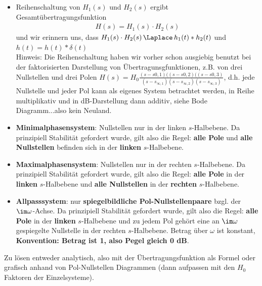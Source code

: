 \begin{Werkzeug}
\begin{itemize}
  \item Reihenschaltung von $H_1(s)$ und $H_2(s)$ ergibt Gesamtübertragungsfunktion
  \begin{align}
    H(s) = H_1(s) \cdot H_2(s)
  \end{align}
  und wir erinnern uns, dass $H_1(s)\cdot H_2(s) \,\Laplace\, h_1(t)\ast h_2(t)$
  und $h(t) = h(t)\ast \delta(t)$\\
  Hinweis: Die Reihenschaltung haben wir vorher schon ausgiebig benutzt bei der faktorisierten
  Darstellung von Übertragunsgfunktionen, z.B. von drei Nullstellen und drei Polen
  $H(s) = H_0 \frac{(s-s{0,1})((s-s{0,2})((s-s{0,3})}{(s-s_{\infty,1})(s-s_{\infty,2})(s-s_{\infty,3})}$,
  d.h. jede Nullstelle und jeder Pol kann als eigenes System betrachtet werden, in Reihe
  multiplikativ und in dB-Darstellung dann additiv, siehe Bode Diagramm...also kein
  Neuland.
  \item \textbf{Minimalphasensystem}: Nullstellen nur in der linken $s$-Halbebene. Da prinzipiell
  Stabilität gefordert wurde, gilt also die Regel: \textbf{alle Pole} und \textbf{alle Nullstellen}
  befinden sich in der \textbf{linken} $s$-Halbebene.
  \item \textbf{Maximalphasensystem}: Nullstellen nur in der rechten $s$-Halbebene. Da prinzipiell
  Stabilität gefordert wurde, gilt also die Regel: \textbf{alle Pole} in der \textbf{linken}
  $s$-Halbebene und \textbf{alle Nullstellen} in der \textbf{rechten} $s$-Halbebene.
  \item \textbf{Allpasssystem}: nur \textbf{spiegelbildliche Pol-Nullstellenpaare} bzgl.
  der $\im\omega$-Achse. Da prinzipiell Stabilität gefordert wurde, gilt also
  die Regel: \textbf{alle Pole} in der \textbf{linken} $s$-Halbebene und zu jedem Pol gehört
  eine an $\im\omega$ gespiegelte Nullstelle in der rechten $s$-Halbebene.
  Betrag über $\omega$ ist konstant, \textbf{Konvention: Betrag ist 1, also Pegel gleich 0 dB}.
\end{itemize}


\end{Werkzeug}
\begin{Ansatz}
Zu lösen entweder analytisch, also mit der Übertragungsfunktion als Formel
oder grafisch anhand von Pol-Nullstellen Diagrammen (dann aufpassen
mit den $H_0$ Faktoren der Einzelsysteme).
\end{Ansatz}

